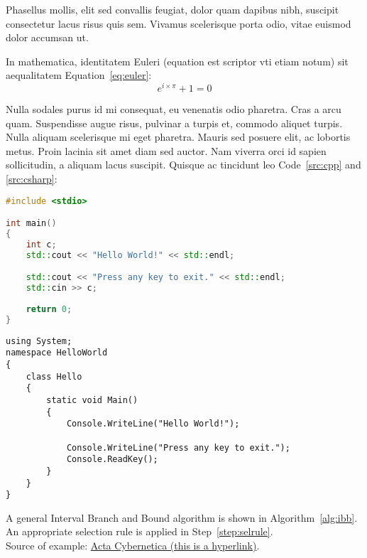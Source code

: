 Phasellus mollis, elit sed convallis feugiat, dolor quam dapibus nibh, suscipit consectetur lacus risus quis sem. Vivamus scelerisque porta odio, vitae euismod dolor accumsan ut.

In mathematica, identitatem Euleri (equation est scriptor vti etiam notum) sit aequalitatem Equation~\ref{eq:euler}:
\begin{equation}\label{eq:euler}
e^{i \times \pi} + 1 = 0
\end{equation}



Nulla sodales purus id mi consequat, eu venenatis odio pharetra. Cras a arcu quam. Suspendisse augue risus, pulvinar a turpis et, commodo aliquet turpis. Nulla aliquam scelerisque mi eget pharetra. Mauris sed posuere elit, ac lobortis metus. Proin lacinia sit amet diam sed auctor. Nam viverra orci id sapien sollicitudin, a aliquam lacus suscipit. Quisque ac tincidunt leo Code~\ref{src:cpp} and \ref{src:csharp}:

\begin{lstlisting}[language={C++}]
#include <stdio>

int main() 
{
	int c;
	std::cout << "Hello World!" << std::endl;

	std::cout << "Press any key to exit." << std::endl;
	std::cin >> c;
	
	return 0;
}
\end{lstlisting}

\begin{lstlisting}[language={[Sharp]C}]
using System;
namespace HelloWorld
{
	class Hello 
	{
		static void Main() 
		{
			Console.WriteLine("Hello World!");
			
			Console.WriteLine("Press any key to exit.");
			Console.ReadKey();
		}
	}
}
\end{lstlisting}


A general Interval Branch and Bound algorithm is shown in Algorithm~\ref{alg:ibb}. An appropriate selection rule is applied in Step~\ref{step:selrule}.\\
Source of example: \href{https://www.inf.u-szeged.hu/actacybernetica/}{Acta Cybernetica (this is a hyperlink)}.

